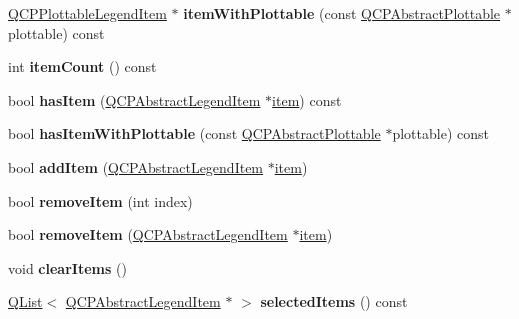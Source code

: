 \begin{DoxyCompactItemize}
\item 
\hyperlink{class_q_c_p_plottable_legend_item}{Q\+C\+P\+Plottable\+Legend\+Item} $\ast$ {\bfseries item\+With\+Plottable} (const \hyperlink{class_q_c_p_abstract_plottable}{Q\+C\+P\+Abstract\+Plottable} $\ast$plottable) const \hypertarget{class_q_c_p_legend_a2ab546bb2fa221a5f8543bd5547f6d16}{}\label{class_q_c_p_legend_a2ab546bb2fa221a5f8543bd5547f6d16}

\item 
int {\bfseries item\+Count} () const \hypertarget{class_q_c_p_legend_a198228e9cdc78d3a3c306fa6763d0404}{}\label{class_q_c_p_legend_a198228e9cdc78d3a3c306fa6763d0404}

\item 
bool {\bfseries has\+Item} (\hyperlink{class_q_c_p_abstract_legend_item}{Q\+C\+P\+Abstract\+Legend\+Item} $\ast$\hyperlink{class_q_c_p_legend_a454272d7094437beb3278a2294006da5}{item}) const \hypertarget{class_q_c_p_legend_a380dd19eb631592e1ebb9b24cc5b398a}{}\label{class_q_c_p_legend_a380dd19eb631592e1ebb9b24cc5b398a}

\item 
bool {\bfseries has\+Item\+With\+Plottable} (const \hyperlink{class_q_c_p_abstract_plottable}{Q\+C\+P\+Abstract\+Plottable} $\ast$plottable) const \hypertarget{class_q_c_p_legend_a2eb1d24bdf5658e64962a656303fd61a}{}\label{class_q_c_p_legend_a2eb1d24bdf5658e64962a656303fd61a}

\item 
bool {\bfseries add\+Item} (\hyperlink{class_q_c_p_abstract_legend_item}{Q\+C\+P\+Abstract\+Legend\+Item} $\ast$\hyperlink{class_q_c_p_legend_a454272d7094437beb3278a2294006da5}{item})\hypertarget{class_q_c_p_legend_a3ab274de52d2951faea45a6d975e6b3f}{}\label{class_q_c_p_legend_a3ab274de52d2951faea45a6d975e6b3f}

\item 
bool {\bfseries remove\+Item} (int index)\hypertarget{class_q_c_p_legend_ac91595c3eaa746fe6321d2eb952c63bb}{}\label{class_q_c_p_legend_ac91595c3eaa746fe6321d2eb952c63bb}

\item 
bool {\bfseries remove\+Item} (\hyperlink{class_q_c_p_abstract_legend_item}{Q\+C\+P\+Abstract\+Legend\+Item} $\ast$\hyperlink{class_q_c_p_legend_a454272d7094437beb3278a2294006da5}{item})\hypertarget{class_q_c_p_legend_a2aea4ec6da2d454dd0b241a254d65082}{}\label{class_q_c_p_legend_a2aea4ec6da2d454dd0b241a254d65082}

\item 
void {\bfseries clear\+Items} ()\hypertarget{class_q_c_p_legend_a24795c7250eb5214fcea16b7217b4dfb}{}\label{class_q_c_p_legend_a24795c7250eb5214fcea16b7217b4dfb}

\item 
\hyperlink{class_q_list}{Q\+List}$<$ \hyperlink{class_q_c_p_abstract_legend_item}{Q\+C\+P\+Abstract\+Legend\+Item} $\ast$ $>$ {\bfseries selected\+Items} () const \hypertarget{class_q_c_p_legend_acade808d75d007a10bf5314da8137695}{}\label{class_q_c_p_legend_acade808d75d007a10bf5314da8137695}

\end{DoxyCompactItemize}

